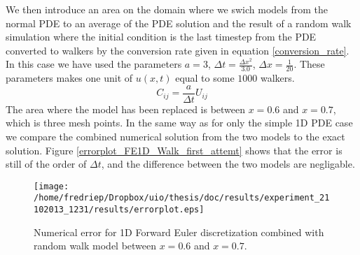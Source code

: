 We then introduce an area on the domain where we swich models from the normal PDE to an average of the PDE solution and the result of a random walk simulation where the initial condition is the last timestep from the PDE converted to walkers by the conversion rate given in equation \ref{conversion_rate}. In this case we have used the parameters $a=3$, $\Delta t = \frac{\Delta x^2}{3.0}$, $\Delta x = \frac{1}{20}$. 
These parameters makes one unit of $u(x,t)$ equal to some $1000$ walkers. 
\begin{equation}\label{conversion_rate}
 C_{ij} = \frac{a}{\Delta t}U_{ij}
\end{equation}
The area where the model has been replaced is between $x=0.6$ and $x=0.7$, which is three mesh points. 
In the same way as for only the simple 1D PDE case we compare the combined numerical solution from the two models to the exact solution. 
Figure \ref{errorplot_FE1D_Walk_first_attemt} shows that the error is still of the order of $\Delta t$, and the difference between the two models are negligable. 
\begin{figure}[H]
\centering
\texttt{[image: /home/fredriep/Dropbox/uio/thesis/doc/results/experiment\_21102013\_1231/results/errorplot.eps]}
\caption{Numerical error for 1D Forward Euler discretization combined with random walk model between $x=0.6$ and $x=0.7$.}
\end{figure}
